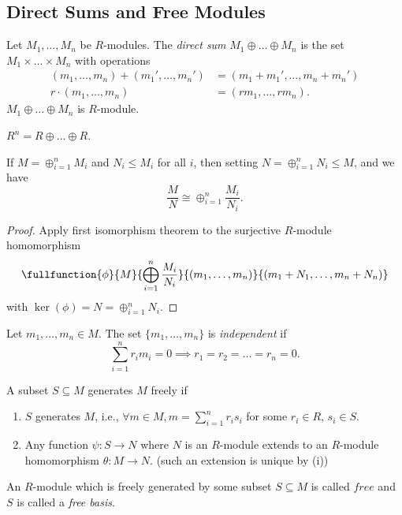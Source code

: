 \subsection{Direct Sums and Free Modules}
\begin{definition}{}{}
    Let \(M_1, \dots, M_n\) be \(R\)-modules. The \textit{direct sum} \(M_1 \oplus \dots \oplus M_n\) is the set \(M_1 \times \dots \times M_n\) with operations
    \begin{align*}
        (m_1, \dots, m_n) + (m_1', \dots, m_n') &= (m_1 + m_1', \dots, m_n + m_n')\\
        r \cdot (m_1, \dots, m_n) &= (r m_1, \dots, r m_n).
    \end{align*}
    \(M_1 \oplus \dots \oplus M_n\) is \(R\)-module.
\end{definition}
\begin{example}
    \(R^n = R \oplus \dots \oplus R\).
\end{example}
\begin{lemma}{}{}
    If \(M = \oplus_{i = 1}^n M_i\) and \(N_i \leq M_i\) for all \(i\), then setting \(N = \oplus_{i=1}^n N_i \leq M\), and we have
    \[
        \frac{M}{N} \cong \oplus_{i=1}^n \frac{M_i}{N_i}.
    \]
\end{lemma}
\begin{proof}
    Apply first isomorphism theorem to the surjective \(R\)-module homomorphism
    \[
        \fullfunction{\phi}{M}{\bigoplus\limits_{i=1}^n \frac{M_i}{N_i}}{(m_1, \dots, m_n)}{(m_1 + N_1, \dots, m_n + N_n)}
    \]
    with \(\ker(\phi) = N = \oplus_{i=1}^n N_i\).
\end{proof}
\begin{definition}{}{}
    Let \(m_1, \dots, m_n \in M\). The set \(\{m_1, \dots, m_n\}\) is \textit{independent} if
    \[\sum_{i=1}^n r_i m_i = 0 \implies r_1 = r_2 = \dots = r_n = 0.
    \]
\end{definition}
\begin{definition}{}{}
    A subset \(S \subseteq M\) generates \(M\) freely if
    \begin{enumerate}
        \item \(S\) generates \(M\), i.e., \(\forall m \in M, m = \sum_{i=1}^n r_i s_i\) for some \(r_i \in R\), \(s_i \in S\).
        \item Any function \(\psi: S \to N\) where \(N\) is an \(R\)-module extends to an \(R\)-module homomorphism \(\theta: M \to N\). (such an extension is unique by (i))
    \end{enumerate}

    An \(R\)-module which is freely generated by some subset \(S \subseteq M\) is called \(free\) and \(S\) is called a \textit{free basis}.
\end{definition}
